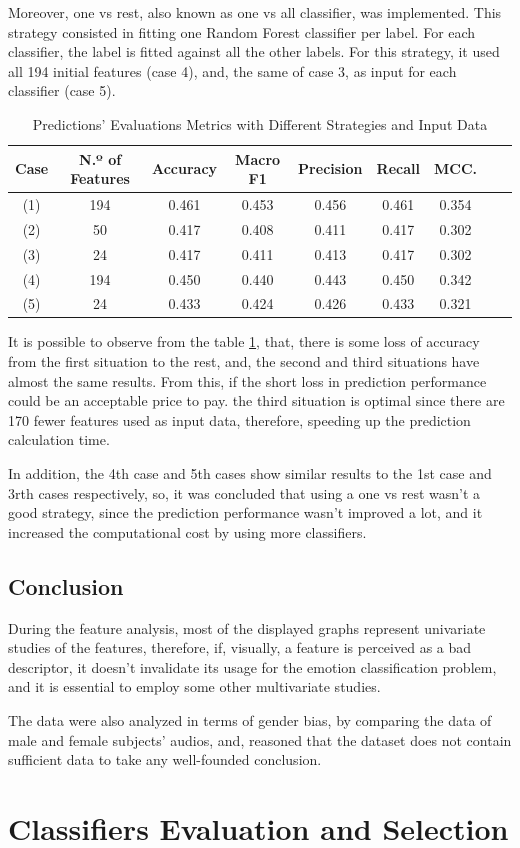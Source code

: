Moreover, one vs rest, also known as one vs all classifier, was implemented. This strategy consisted in fitting one Random Forest classifier per label. For each classifier, the label is fitted against all the other labels. For this strategy, it used all 194 initial features (case 4), and, the same of case 3, as input for each classifier (case 5).


\begin{table}[H]
	\caption{Predictions' Evaluations Metrics with Different Strategies and Input Data}
	\centering
	\label{tab:acc}
	\begin{tabular}{ccccccccc}
		\toprule
		Case & N.º of Features & Accuracy & Macro F1 & Precision & Recall & MCC. \\
		\midrule
		(1) & 194 & 0.461 & 0.453 & 0.456 & 0.461 & 0.354\\
		(2) &  50 & 0.417 & 0.408 & 0.411 & 0.417 & 0.302\\
		(3) &  24 & 0.417 & 0.411 & 0.413 & 0.417 & 0.302\\
		(4) & 194 & 0.450 & 0.440 & 0.443 & 0.450 & 0.342\\
		(5) &  24 & 0.433 & 0.424 & 0.426 & 0.433 & 0.321\\
		\bottomrule
	\end{tabular}
\end{table}


It is possible to observe from the table \ref{tab:acc}, that, there is some loss of accuracy from the first situation to the rest, and, the second and third situations have almost the same results. From this, if the short loss in prediction performance could be an acceptable price to pay. the third situation is optimal since there are 170 fewer features used as input data, therefore, speeding up the prediction calculation time.

In addition, the 4th case and 5th cases show similar results to the 1st case and 3rth cases respectively, so, it was concluded that using a one vs rest wasn't a good strategy, since the prediction performance wasn't improved a lot, and it increased the computational cost by using more classifiers.


\subsection{Conclusion}

During the feature analysis, most of the displayed graphs represent univariate studies of the features, therefore, if, visually, a feature is perceived as a bad descriptor, it doesn't invalidate its usage for the emotion classification problem, and it is essential to employ some other multivariate studies.

The data were also analyzed in terms of gender bias, by comparing the data of male and female subjects' audios, and, reasoned that the dataset does not contain sufficient data to take any well-founded conclusion.

\section{Classifiers Evaluation and Selection}